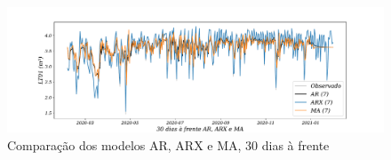 \begin{figure}[!htb]
	\centering
	\caption{Comparação dos modelos AR, ARX e MA, 30 dias à frente }
	\label{fig:60-AR-ARX-MA24}
	\includegraphics[width=1\linewidth]{Apendices/Figuras/modelagem-24h/30-AR-ARX-MA}
	
\end{figure}

